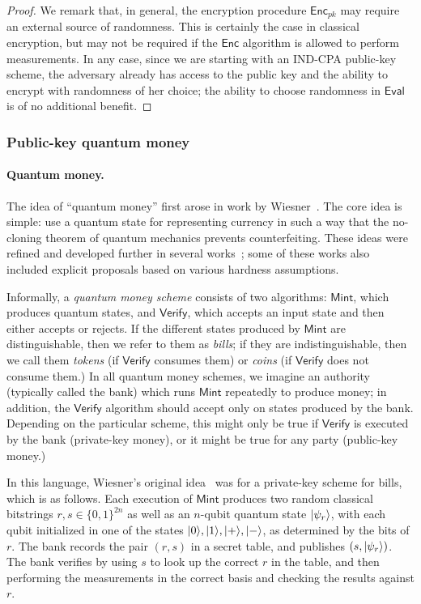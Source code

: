 \documentclass[11pt]{article}
\numberwithin{equation}{section}
\newcommand{\Enc}{\ensuremath{\mathsf{Enc}}\xspace}
\newcommand{\Mint}{\ensuremath{\mathsf{Mint}}\xspace}
\newcommand{\Verify}{\ensuremath{\mathsf{Verify}}\xspace}
\newcommand\Eval{\ensuremath{\mathsf{Eval}}\xspace}
\begin{document}
{\begin{proof}
We remark that, in general, the encryption procedure $\Enc_{pk}$ may require an external source of randomness. This is certainly the case in classical encryption, but may not be required if the $\Enc$ algorithm is allowed to perform measurements. In any case, since we are starting with an IND-CPA public-key scheme, the adversary already has access to the public key and the ability to encrypt with randomness of her choice; the ability to choose randomness in $\Eval$ is of no additional benefit.
\end{proof}

\subsubsection{Public-key quantum money}

\paragraph{Quantum money.}
The idea of ``quantum money'' first arose in work by Wiesner~\cite{Wie1983}. The core idea is simple: use a quantum state for representing currency in such a way that the no-cloning theorem of quantum mechanics prevents counterfeiting. These ideas were refined and developed further in several works~\cite{Aar09, AC12, BBBW83, FGHLS12, MS10}; some of these works also included explicit proposals based on various hardness assumptions. 

Informally, a \emph{quantum money scheme} consists of two algorithms: \Mint, which produces quantum states, and \Verify, which accepts an input state and then either accepts or rejects. If the different states produced by \Mint are distinguishable, then we refer to them as \emph{bills}; if they are indistinguishable, then we call them \emph{tokens} (if \Verify consumes them) or \emph{coins} (if \Verify does not consume them.) In all quantum money schemes, we imagine an authority (typically called the bank) which runs \Mint repeatedly to produce money; in addition, the \Verify algorithm should accept only on states produced by the bank. Depending on the particular scheme, this might only be true if \Verify is executed by the bank (private-key money), or it might be true for any party (public-key money.)

In this language, Wiesner's original idea~\cite{Wie1983} was for a private-key scheme for bills, which is as follows. Each execution of \Mint produces two random classical bitstrings $r, s \in \{0, 1\}^{2n}$ as well as an $n$-qubit quantum state ${\left\vert{\psi_r}\right\rangle}$, with each qubit initialized in one of the states ${\left\vert{0}\right\rangle}, {\left\vert{1}\right\rangle}, {\left\vert{+}\right\rangle}, {\left\vert{-}\right\rangle}$, as determined by the bits of $r$. The bank records the pair $(r, s)$ in a secret table, and publishes $(s, {\left\vert{\psi_r}\right\rangle})$. The bank verifies by using $s$ to look up the correct $r$ in the table, and then performing the measurements in the correct basis and checking the results against $r$. 

}
\end{document}
